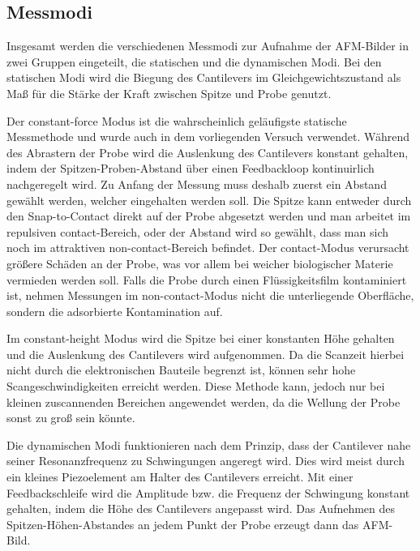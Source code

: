 \subsection{Messmodi}
\label{sec:messmodi}
    Insgesamt werden die verschiedenen Messmodi zur Aufnahme der AFM-Bilder in zwei Gruppen eingeteilt, die statischen und die dynamischen Modi.
    Bei den statischen Modi wird die Biegung des Cantilevers im Gleichgewichtszustand als Maß für die Stärke der Kraft zwischen Spitze und Probe genutzt.

    Der constant-force Modus ist die wahrscheinlich geläufigste statische Messmethode und wurde auch in dem vorliegenden Versuch verwendet.
    Während des Abrastern der Probe wird die Auslenkung des Cantilevers konstant gehalten, indem der Spitzen-Proben-Abstand über einen Feedbackloop kontinuirlich nachgeregelt wird.
    Zu Anfang der Messung muss deshalb zuerst ein Abstand gewählt werden, welcher eingehalten werden soll.
    Die Spitze kann entweder durch den Snap-to-Contact direkt auf der Probe abgesetzt werden und man arbeitet im repulsiven contact-Bereich, oder der Abstand wird so gewählt, dass man sich noch im attraktiven non-contact-Bereich befindet.
    Der contact-Modus verursacht größere Schäden an der Probe, was vor allem bei weicher biologischer Materie vermieden werden soll.
    Falls die Probe durch einen Flüssigkeitsfilm kontaminiert ist, nehmen Messungen im non-contact-Modus nicht die unterliegende Oberfläche, sondern die adsorbierte Kontamination auf.

    Im constant-height Modus wird die Spitze bei einer konstanten Höhe gehalten und die Auslenkung des Cantilevers wird aufgenommen.
    Da die Scanzeit hierbei nicht durch die elektronischen Bauteile begrenzt ist, können sehr hohe Scangeschwindigkeiten erreicht werden.
    Diese Methode kann, jedoch nur bei kleinen zuscannenden Bereichen angewendet werden, da die Wellung der Probe sonst zu groß sein könnte.

    Die dynamischen Modi funktionieren nach dem Prinzip, dass der Cantilever nahe seiner Resonanzfrequenz zu Schwingungen angeregt wird.
    Dies wird meist durch ein kleines Piezoelement am Halter des Cantilevers erreicht.
    Mit einer Feedbackschleife wird die Amplitude bzw. die Frequenz der Schwingung konstant gehalten, indem die Höhe des Cantilevers angepasst wird.
    Das Aufnehmen des Spitzen-Höhen-Abstandes an jedem Punkt der Probe erzeugt dann das AFM-Bild.

